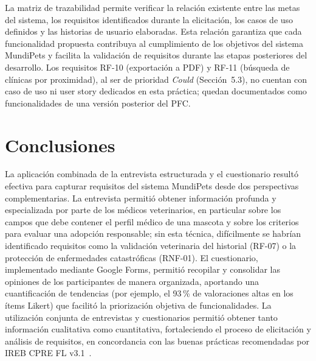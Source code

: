 \documentclass[journal,onecolumn]{IEEEtran}
\begin{document}
La matriz de trazabilidad permite verificar la relación existente entre las
metas del sistema, los requisitos identificados durante la elicitación, los
casos de uso definidos y las historias de usuario elaboradas. Esta relación
garantiza que cada funcionalidad propuesta contribuya al cumplimiento de
los objetivos del sistema MundiPets y facilita la validación de requisitos
durante las etapas posteriores del desarrollo. Los requisitos RF-10
(exportación a PDF) y RF-11 (búsqueda de clínicas por proximidad), al ser de
prioridad \textit{Could} (Sección~5.3), no cuentan con caso de uso ni user
story dedicados en esta práctica; quedan documentados como funcionalidades
de una versión posterior del PFC.

\newpage

\section{Conclusiones}

La aplicación combinada de la entrevista estructurada y el cuestionario
resultó efectiva para capturar requisitos del sistema MundiPets desde dos
perspectivas complementarias. La entrevista permitió obtener información
profunda y especializada por parte de los médicos veterinarios, en
particular sobre los campos que debe contener el perfil médico de una
mascota y sobre los criterios para evaluar una adopción responsable; sin
esta técnica, difícilmente se habrían identificado requisitos como la
validación veterinaria del historial (RF-07) o la protección de
enfermedades catastróficas (RNF-01). El cuestionario, implementado mediante
Google Forms, permitió recopilar y consolidar las opiniones de los
participantes de manera organizada, aportando una cuantificación de
tendencias (por ejemplo, el 93\,\% de valoraciones altas en los ítems
Likert) que facilitó la priorización objetiva de funcionalidades. La
utilización conjunta de entrevistas y cuestionarios permitió obtener tanto
información cualitativa como cuantitativa, fortaleciendo el proceso de
elicitación y análisis de requisitos, en concordancia con las buenas
prácticas recomendadas por IREB CPRE FL v3.1~\cite{ireb2023}.
\end{document}
